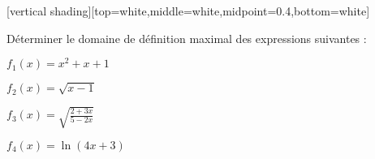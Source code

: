 











[vertical shading][top=white,middle=white,midpoint=0.4,bottom=white] 


\begin{frame}

\thispagestyle{empty}    

\vfil

\Large

\center
\begin{minipage}{0.8\textwidth}
\center
\enonce
    Déterminer le domaine de définition maximal des expressions suivantes :

    \begin{examplescol}{2}
        \item $f_1(x) = x^2 +x+1$
        \item $f_2(x) = \sqrt {x-1}$
        \item $f_3(x) = \sqrt{\frac{2 + 3 x}{5-2x}}$
        \item $f_4(x) = \ln (4 x + 3)$
    \end{examplescol}
\finenonce
\end{minipage}






\end{frame}


